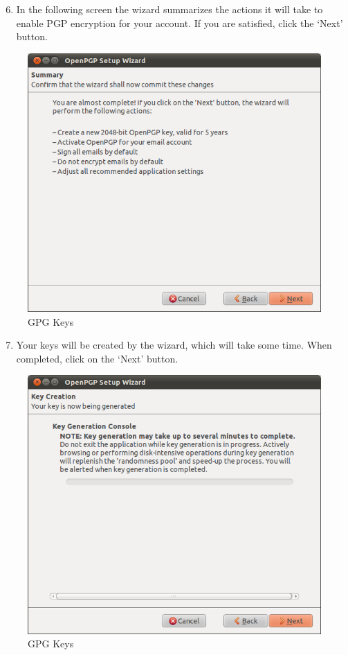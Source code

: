 \begin{enumerate}[1.]
\setcounter{enumi}{5}
\item
  In the following screen the wizard summarizes the actions it will take
  to enable PGP encryption for your account. If you are satisfied, click
  the `Next' button.
\end{enumerate}
\begin{figure}[htbp]
\centering
\includegraphics{gpg_keys_6.png}
\caption{GPG Keys}
\end{figure}

\begin{enumerate}[1.]
\setcounter{enumi}{6}
\item
  Your keys will be created by the wizard, which will take some time.
  When completed, click on the `Next' button.
\end{enumerate}
\begin{figure}[htbp]
\centering
\includegraphics{gpg_keys_7.png}
\caption{GPG Keys}
\end{figure}

